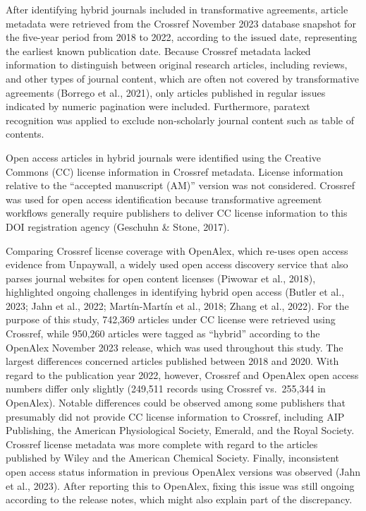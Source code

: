 \documentclass[a4paper,man,floatsintext,longtable,noextraspace,12pt]{apa6}
\begin{document}
After identifying hybrid journals included in transformative agreements,
article metadata were retrieved from the Crossref November 2023 database
snapshot for the five-year period from 2018 to 2022, according to the
issued date, representing the earliest known publication date. Because
Crossref metadata lacked information to distinguish between original
research articles, including reviews, and other types of journal
content, which are often not covered by transformative agreements
(Borrego et al., 2021), only articles published in regular issues
indicated by numeric pagination were included. Furthermore, paratext
recognition was applied to exclude non-scholarly journal content such as
table of contents.

Open access articles in hybrid journals were identified using the
Creative Commons (CC) license information in Crossref metadata. License
information relative to the ``accepted manuscript (AM)'' version was not
considered. Crossref was used for open access identification because
transformative agreement workflows generally require publishers to
deliver CC license information to this DOI registration agency (Geschuhn
\& Stone, 2017).

Comparing Crossref license coverage with OpenAlex, which re-uses open
access evidence from Unpaywall, a widely used open access discovery
service that also parses journal websites for open content licenses
(Piwowar et al., 2018), highlighted ongoing challenges in identifying
hybrid open access (Butler et al., 2023; Jahn et al., 2022;
Martín-Martín et al., 2018; Zhang et al., 2022). For the purpose of this
study, 742,369 articles under CC license were retrieved using Crossref,
while 950,260 articles were tagged as ``hybrid'' according to the
OpenAlex November 2023 release, which was used throughout this study.
The largest differences concerned articles published between 2018 and
2020. With regard to the publication year 2022, however, Crossref and
OpenAlex open access numbers differ only slightly (249,511 records using
Crossref vs.~255,344 in OpenAlex). Notable differences could be observed
among some publishers that presumably did not provide CC license
information to Crossref, including AIP Publishing, the American
Physiological Society, Emerald, and the Royal Society. Crossref license
metadata was more complete with regard to the articles published by
Wiley and the American Chemical Society. Finally, inconsistent open
access status information in previous OpenAlex versions was observed
(Jahn et al., 2023). After reporting this to OpenAlex, fixing this issue
was still ongoing according to the release notes, which might also
explain part of the discrepancy.
\end{document}
